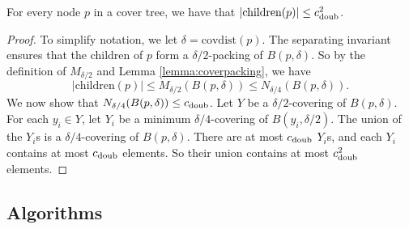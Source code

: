 \documentclass[../main.tex]{subfiles}
\newcommand{\doubnum}{c_\textnormal{doub}}
\newcommand{\p}{\ensuremath p}
\newcommand{\mkfunction}[1]{\ensuremath{\text{{#1}}}}
\newcommand{\children}[1]   {\mkfunction{children}({#1})}
\newcommand{\covdist}[1]    {\mkfunction{covdist}({#1})}
\begin{document}

\begin{lemma}
    \label{lemma:children}
    For every node $p$ in a cover tree, we have that
    $|\children\p| \le \doubnum^2$.
\end{lemma}

\begin{proof}
    To simplify notation, we let $\delta=\covdist{p}$.
    The separating invariant ensures that the children of $p$ form a $\delta/2$-packing of $B(p,\delta)$.
    So by the definition of $M_{\delta/2}$ and Lemma \ref{lemma:coverpacking}, we have
    \begin{equation}
        |\children{p}| 
        \le M_{\delta/2}(B(p,\delta)) 
        \le N_{\delta/4}(B(p,\delta)) 
        .
    \end{equation}
    We now show that $N_{\delta/4}(B(p,\delta))\le\doubnum$.
    Let $Y$ be a $\delta/2$-covering of $B(p,\delta)$.
    For each $y_i\in Y$, let $Y_i$ be a minimum $\delta/4$-covering of $B(y_i,\delta/2)$.
    The union of the $Y_i$s is a $\delta/4$-covering of $B(p,\delta)$.
    There are at most $\doubnum$ $Y_i$s, and each $Y_i$ contains at most $\doubnum$ elements.
    So their union contains at most $\doubnum^2$ elements.
\end{proof}


\subsection{Algorithms}
\end{document}
